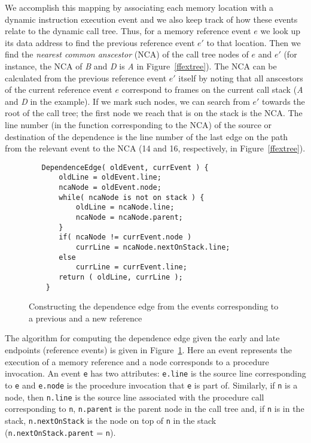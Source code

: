 \documentclass{acm_proc_article-sp}
\begin{document}
We accomplish this mapping by associating each memory location with a dynamic
instruction execution event and we also keep track of how these events 
relate to the dynamic call tree. Thus, for a memory reference event $e$ we 
look up its data address to find the previous reference event $e'$ to that 
location. Then we find the {\em nearest common anscestor} (NCA) of the call
tree nodes of $e$ and $e'$ (for instance, the NCA of {\it B} and {\it D} is
{\it A} in Figure~\ref{ffextree}). The NCA can be calculated from the previous
reference event $e'$ itself by noting that all anscestors of the current
reference event $e$ correspond to frames on the current call stack ({\it A} 
and {\it D} in the example). If we mark 
such nodes, we can search from $e'$ 
towards the root of the call tree; the first node we reach that is on the 
stack is the NCA.
The line number (in the function corresponding to the NCA) of the source or 
destination of the dependence is the line number of the last edge on the path 
from the relevant event to the NCA (14 and 16, respectively, in 
Figure~\ref{ffextree}).


\begin{figure}
\small
\hrulefill
\begin{verbatim}
   DependenceEdge( oldEvent, currEvent ) {
       oldLine = oldEvent.line;
       ncaNode = oldEvent.node;
       while( ncaNode is not on stack ) {
           oldLine = ncaNode.line;
           ncaNode = ncaNode.parent;
       }
       if( ncaNode != currEvent.node )
           currLine = ncaNode.nextOnStack.line;
       else
           currLine = currEvent.line;
       return ( oldLine, currLine );
    }
\end{verbatim}
\hrulefill
\caption{Constructing the dependence edge from the events corresponding
to a previous and a new reference}
\label{fdepedge}
\end{figure}    

The algorithm for computing the dependence edge given the early and late
endpoints (reference events) is given in Figure~\ref{fdepedge}. Here an 
event represents the execution of a memory reference and a node corresponds 
to a procedure invocation. An event {\tt e} has two attributes: {\tt e.line} 
is the source line corresponding to {\tt e} and {\tt e.node} is the procedure 
invocation that {\tt e} is part of. Similarly, if {\tt n} is a node, then 
{\tt n.line} is the source line associated with the procedure call 
corresponding to {\tt n}, {\tt n.parent} is the parent node in the call tree 
and, if {\tt n} is in the stack, {\tt n.nextOnStack} is the node on top of 
{\tt n} in the stack ({\tt n.nextOnStack.parent} = {\tt n}).
\end{document}
